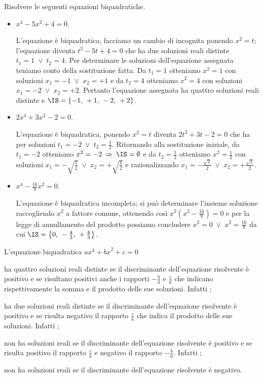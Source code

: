 \begin{exrig}
\begin{esempio}
Risolvere le seguenti equazioni biquadratiche.
\begin{itemize}
\item $ x^4-5x^2+4=0 $.

L'equazione è biquadratica; facciamo un cambio di incognita ponendo $x^2=t$; l'equazione diventa $t^2-5t+4=0$ che ha due soluzioni reali distinte $t_1=1\;\vee \;t_2=4$. Per determinare le soluzioni dell'equazione assegnata teniamo conto della sostituzione fatta. Da $t_1=1$ otteniamo $x^2=1$ con soluzioni $x_1=-1\;\vee\; x_2=+1$ e da $t_2=4$ otteniamo $x^2=4$ con soluzioni $x_1=-2\;\vee\; x_2=+2$. Pertanto l'equazione assegnata ha quattro soluzioni reali distinte e $\IS=\{-1\text{, }+1\text{, }-2\text{, }+2\}$.

\item $ 2x^4+3x^2-2=0 $.

L'equazione è biquadratica, ponendo $x^2=t$ diventa $2t^2+3t-2=0$ che ha per soluzioni $t_1=-2\;\vee\; t_2=\frac 1 2$. Ritornando alla sostituzione iniziale, da $t_1=-2$ otteniamo $x^2=-2\:\Rightarrow\: \IS=\emptyset $ e da $t_2=\frac 1 2$ otteniamo $x^2=\frac 1 2$ con soluzioni $x_1=-\sqrt{\frac 1 2}\;\vee\; x_2=+\sqrt{\frac 1 2}$ e razionalizzando $x_1=-\frac{\sqrt 2} 2\;\vee\; x_2=+\frac{\sqrt 2} 2$.

\item $ x^4-\frac{16} 9x^2=0 $.

L'equazione è biquadratica incompleta; si può determinare l'insieme soluzione raccogliendo $x^2$ a fattore comune, ottenendo così $x^2\left(x^2-\frac{16} 9\right)=0$ e per la legge di annullamento del prodotto possiamo concludere $x^2=0\;\vee\; x^2=\frac{16} 9$ da cui $\IS=\left\{0\text{, }-\frac 4 3\text{, }+\frac 4 3\right\}$.
 \end{itemize}

\end{esempio}
\end{exrig}
\conclusione
L'equazione biquadratica ${ax}^4+{bx}^2+c=0$
\begin{itemize*}
\item ha quattro soluzioni reali distinte se il discriminante dell'equazione risolvente è positivo e se risultano positivi anche i rapporti $-\frac b a$ e $\frac c a$ che indicano rispettivamente la somma e il prodotto delle sue soluzioni. Infatti \dotfill;
\item ha due soluzioni reali distinte se il discriminante dell'equazione risolvente è positivo e se risulta negativo il rapporto $\frac c a$ che indica il prodotto delle sue soluzioni. Infatti \dotfill;
\item non ha soluzioni reali se il discriminante dell'equazione risolvente è positivo e se risulta positivo il rapporto $\frac c a$ e negativo il rapporto $-\frac b a$. Infatti \dotfill;
\item non ha soluzioni reali se il discriminante dell'equazione risolvente è negativo.
\end{itemize*}
